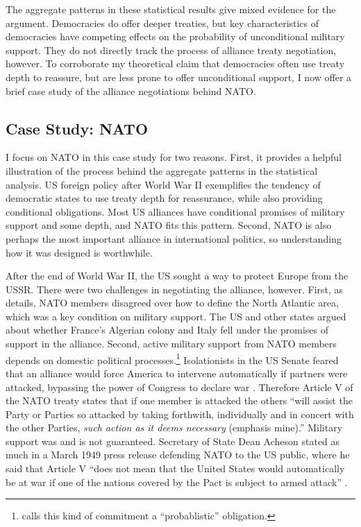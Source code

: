 \documentclass[12pt]{article}
\begin{document}
The aggregate patterns in these statistical results give mixed evidence for the argument. 
Democracies do offer deeper treaties, but key characteristics of democracies have competing effects on the probability of unconditional military support. 
They do not directly track the process of alliance treaty negotiation, however. 
To corroborate my theoretical claim that democracies often use treaty depth to reassure, but are less prone to offer unconditional support, I now offer a brief case study of the alliance negotiations behind NATO. 


\subsection{Case Study: NATO}


I focus on NATO in this case study for two reasons. 
First, it provides a helpful illustration of the process behind the aggregate patterns in the statistical analysis. 
US foreign policy after World War II exemplifies the tendency of democratic states to use treaty depth for reassurance, while also providing conditional obligations.  
Most US alliances have conditional promises of military support and some depth, and NATO fits this pattern.
Second, NATO is also perhaps the most important alliance in international politics, so understanding how it was designed is worthwhile. 


After the end of World War II, the US sought a way to protect Europe from the USSR. 
There were two challenges in negotiating the alliance, however.
First, as \citet{Poast2019a} details, NATO members disagreed over how to define the North Atlantic area, which was a key condition on military support. 
The US and other states argued about whether France's Algerian colony and Italy fell under the promises of support in the alliance. 
Second, active military support from NATO members depends on domestic political processes.\footnote{\citet{Benson2012} calls this kind of commitment a ``probablistic'' obligation.} 
Isolationists in the US Senate feared that an alliance would force America to intervene automatically if partners were attacked, bypassing the power of Congress to declare war \citep[pg. 280-1]{Acheson1969}.
Therefore Article V of the NATO treaty states that if one member is attacked the others ``will assist the Party or Parties so attacked by taking forthwith, individually and in concert with the other Parties, \emph{such action as it deems necessary} (emphasis mine).'' 
Military support was and is not guaranteed. 
Secretary of State Dean Acheson stated as much in a March 1949 press release defending NATO to the US public, where he said that Article V ``does not mean that the United States would automatically be at war if one of the nations covered by the Pact is subject to armed attack'' \citep{Acheson1949}. 
\end{document}
